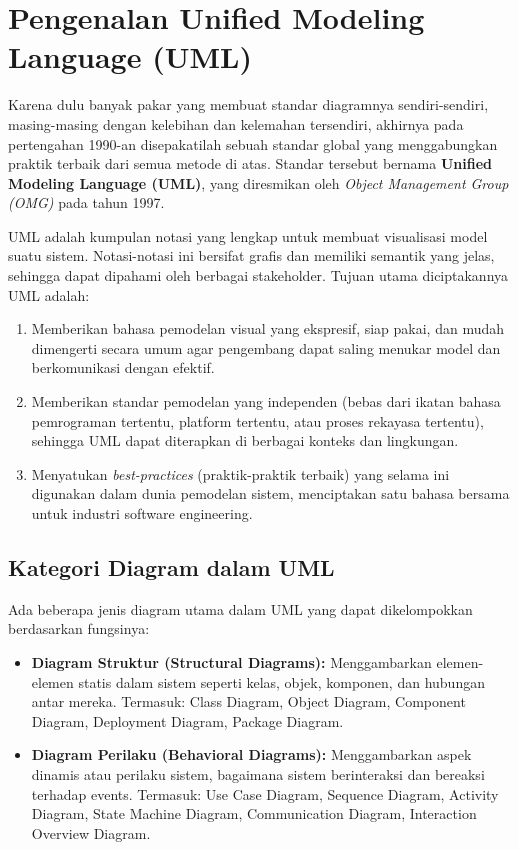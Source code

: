 \documentclass[12pt,a4paper]{article}
\begin{document}
\newpage
\section{Pengenalan Unified Modeling Language (UML)}

Karena dulu banyak pakar yang membuat standar diagramnya sendiri-sendiri, masing-masing dengan kelebihan dan kelemahan tersendiri, akhirnya pada pertengahan 1990-an disepakatilah sebuah standar global yang menggabungkan praktik terbaik dari semua metode di atas. Standar tersebut bernama \textbf{Unified Modeling Language (UML)}, yang diresmikan oleh \textit{Object Management Group (OMG)} pada tahun 1997.

UML adalah kumpulan notasi yang lengkap untuk membuat visualisasi model suatu sistem. Notasi-notasi ini bersifat grafis dan memiliki semantik yang jelas, sehingga dapat dipahami oleh berbagai stakeholder. Tujuan utama diciptakannya UML adalah:

\begin{enumerate}
    \item Memberikan bahasa pemodelan visual yang ekspresif, siap pakai, dan mudah dimengerti secara umum agar pengembang dapat saling menukar model dan berkomunikasi dengan efektif.
    
    \item Memberikan standar pemodelan yang independen (bebas dari ikatan bahasa pemrograman tertentu, platform tertentu, atau proses rekayasa tertentu), sehingga UML dapat diterapkan di berbagai konteks dan lingkungan.
    
    \item Menyatukan \textit{best-practices} (praktik-praktik terbaik) yang selama ini digunakan dalam dunia pemodelan sistem, menciptakan satu bahasa bersama untuk industri software engineering.
\end{enumerate}

\subsection{Kategori Diagram dalam UML}

Ada beberapa jenis diagram utama dalam UML yang dapat dikelompokkan berdasarkan fungsinya:

\begin{itemize}
    \item \textbf{Diagram Struktur (Structural Diagrams):} Menggambarkan elemen-elemen statis dalam sistem seperti kelas, objek, komponen, dan hubungan antar mereka. Termasuk: Class Diagram, Object Diagram, Component Diagram, Deployment Diagram, Package Diagram.
    
    \item \textbf{Diagram Perilaku (Behavioral Diagrams):} Menggambarkan aspek dinamis atau perilaku sistem, bagaimana sistem berinteraksi dan bereaksi terhadap events. Termasuk: Use Case Diagram, Sequence Diagram, Activity Diagram, State Machine Diagram, Communication Diagram, Interaction Overview Diagram.
\end{itemize}
\end{document}
